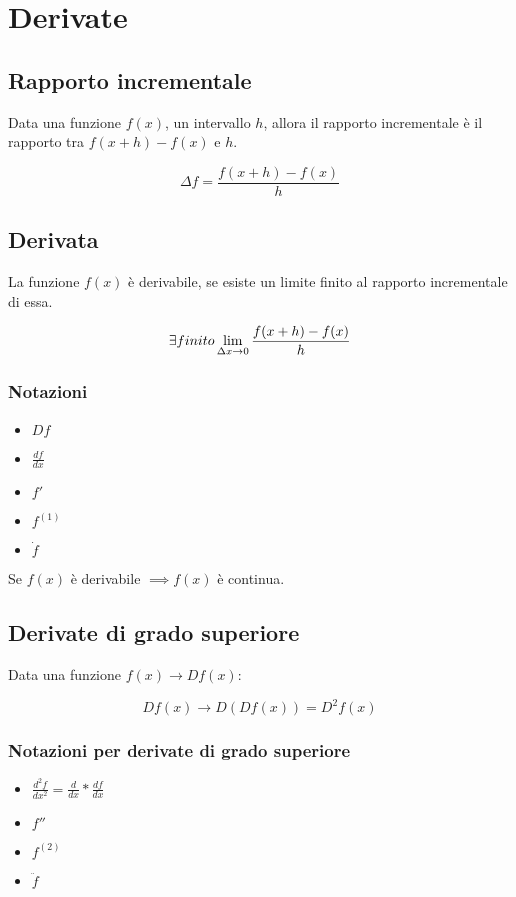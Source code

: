 \documentclass{article}
\begin{document}
\section{Derivate}

\subsection{Rapporto incrementale}

Data una funzione $f(x)$, un intervallo $h$, allora il rapporto incrementale è il rapporto tra $f(x + h) - f(x)$ e $h$.

$$
\Delta f = \frac{f(x + h) - f(x)}{h}
$$

\subsection{Derivata}

La funzione $f(x)$ è derivabile, se esiste un limite finito al rapporto incrementale di essa.

$$
\exists \space finito \lim_{\Delta x \to 0} \frac{f(x + h) - f(x)}{h}
$$

\subsubsection{Notazioni}

\begin{itemize}
    \item $Df$
    \item $\frac{df}{dx}$
    \item $f'$
    \item $f^{(1)}$
    \item $\dot{f}$
\end{itemize}

Se $f(x)$ è derivabile $\implies f(x)$ è continua.

\subsection{Derivate di grado superiore}

Data una funzione $f(x) \to Df(x)$:

$$
Df(x) \to D(Df(x)) = D^2f(x)
$$

\subsubsection{Notazioni per derivate di grado superiore}

\begin{itemize}
    \item$\frac{d^2f}{dx^2} = \frac{d}{dx} * \frac{df}{dx}$
    \item $f''$
    \item $f^{(2)}$
    \item $\ddot{f}$
\end{itemize}
\end{document}
